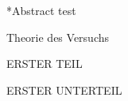\documentclass[pdftex, a4paper,11pt, twoside]{report}
\begin{document}
  
  
  \begin{chapter}*{Abstract}
    test
  \end{chapter}
  
  \tableofcontents
  
  
  
  \begin{chapter}{Theorie des Versuchs}
    \label{chp:Theorie}
    
    
    
    \begin{section}{ERSTER TEIL}
      \label{chp:Theorie:sec:ERSTERTEIL}
      
      
      
      \begin{subsection}{ERSTER UNTERTEIL}
	\label{chp:Theorie:sec:ERSTERTEIL:subsec:UNTERTEIL}
       
       
       
      \end{subsection}
      
      
    \end{section}
    
  \end{chapter}
  
  
  
\end{document}
